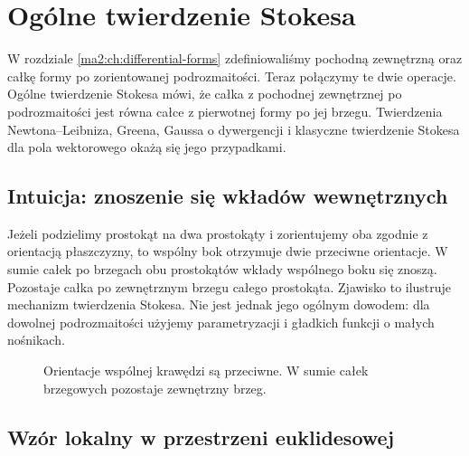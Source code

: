 \chapter{Ogólne twierdzenie Stokesa}
\label{ma2:ch:stokes}

W rozdziale \ref{ma2:ch:differential-forms}
zdefiniowaliśmy pochodną zewnętrzną oraz całkę
formy po zorientowanej podrozmaitości.
Teraz połączymy te dwie operacje.
Ogólne twierdzenie Stokesa mówi, że całka
z pochodnej zewnętrznej po podrozmaitości
jest równa całce z pierwotnej formy po jej brzegu.
Twierdzenia Newtona--Leibniza, Greena, Gaussa
o dywergencji i klasyczne twierdzenie Stokesa
dla pola wektorowego okażą się jego przypadkami.

\section{Intuicja: znoszenie się wkładów wewnętrznych}

Jeżeli podzielimy prostokąt na dwa prostokąty
i zorientujemy oba zgodnie z orientacją płaszczyzny,
to wspólny bok otrzymuje dwie przeciwne orientacje.
W sumie całek po brzegach obu prostokątów wkłady
wspólnego boku się znoszą. Pozostaje całka
po zewnętrznym brzegu całego prostokąta.
Zjawisko to ilustruje mechanizm twierdzenia Stokesa.
Nie jest jednak jego ogólnym dowodem: dla dowolnej
podrozmaitości użyjemy parametryzacji i gładkich
funkcji o małych nośnikach.

\begin{figure}[htbp]
\centering
{}
\caption{Orientacje wspólnej krawędzi są przeciwne.
W sumie całek brzegowych pozostaje zewnętrzny brzeg.}
\label{ma2:fig:stokes-cancellation}
\end{figure}

\section{Wzór lokalny w przestrzeni euklidesowej}

